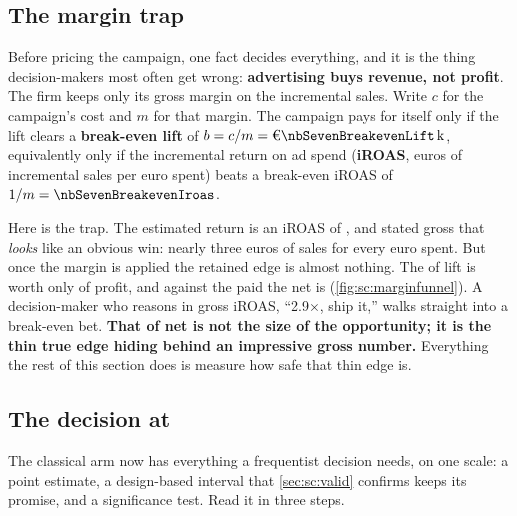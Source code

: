 \subsection*{The margin trap}

Before pricing the campaign, one fact decides everything, and it is the thing decision-makers most
often get wrong: \textbf{advertising buys revenue, not profit}. The firm keeps only its
\pc{\nbSevenMargin} gross margin on the incremental sales. Write $c$ for the campaign's cost and $m$
for that margin. The campaign pays for itself only if the
lift clears a \textbf{break-even lift} of $b = c/m = \keur{\nbSevenBreakevenLift}$, equivalently only
if the incremental return on ad spend (\textbf{iROAS}, euros of incremental sales per euro spent)
beats a break-even iROAS of $1/m = \nbSevenBreakevenIroas$.

Here is the trap. The estimated return is an iROAS of \nbSevenIroas{}, and stated gross that
\emph{looks} like an obvious win: nearly three euros of sales for every euro spent. But once the margin
is applied the retained edge is almost nothing. The \keur{\nbSevenClTotal} of lift is worth only
\keur{\nbSevenClProfit} of profit, and against the \keur{\nbSevenCost} paid the net is
\keur{\nbSevenClNet} (\cref{fig:sc:marginfunnel}). A decision-maker who reasons in gross iROAS,
``2.9$\times$, ship it,'' walks straight into a break-even bet. \textbf{That \keur{\nbSevenClNet} of net
is not the size of the opportunity; it is the thin true edge hiding behind an impressive gross number.}
Everything the rest of this section does is measure how safe that thin edge is.



\subsection*{The decision at \keur{\nbSevenCost}}
\label{sec:sc:classicaldecision}

The classical arm now has everything a frequentist decision needs, on one scale: a point estimate, a
design-based interval that \cref{sec:sc:valid} confirms keeps its promise, and a significance test.
Read it in three steps.


